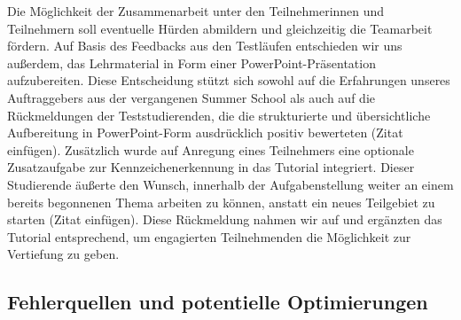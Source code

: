  Die Möglichkeit der Zusammenarbeit unter den Teilnehmerinnen und Teilnehmern soll eventuelle Hürden abmildern und gleichzeitig die Teamarbeit fördern.
Auf Basis des Feedbacks aus den Testläufen entschieden wir uns außerdem, das Lehrmaterial in Form einer PowerPoint-Präsentation aufzubereiten.
 Diese Entscheidung stützt sich sowohl auf die Erfahrungen unseres Auftraggebers aus der vergangenen Summer School als auch auf die Rückmeldungen der Teststudierenden, die die strukturierte und übersichtliche Aufbereitung in PowerPoint-Form ausdrücklich positiv bewerteten (Zitat einfügen).
Zusätzlich wurde auf Anregung eines Teilnehmers eine optionale Zusatzaufgabe zur Kennzeichenerkennung in das Tutorial integriert.
 Dieser Studierende äußerte den Wunsch, innerhalb der Aufgabenstellung weiter an einem bereits begonnenen Thema arbeiten zu können, anstatt ein neues Teilgebiet zu starten (Zitat einfügen).
 Diese Rückmeldung nahmen wir auf und ergänzten das Tutorial entsprechend, um engagierten Teilnehmenden die Möglichkeit zur Vertiefung zu geben.
\subsection{Fehlerquellen und potentielle Optimierungen}